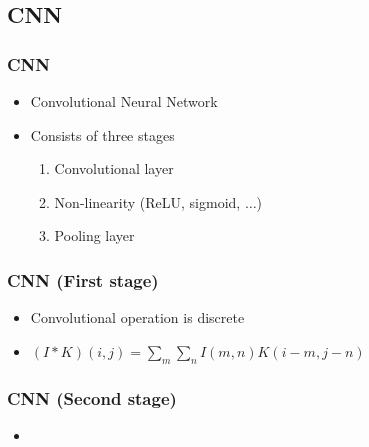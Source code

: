  \subsection{CNN}
  \begin{frame}
   \frametitle{CNN}
   
   \begin{itemize}
    \item<1-> Convolutional Neural Network
    \item<2-> Consists of three stages
    \begin{enumerate}
     \item<3-> Convolutional layer
     \item<4-> Non-linearity (ReLU, sigmoid, $\ldots$)
     \item<5-> Pooling layer
    \end{enumerate}
   \end{itemize}

  \end{frame}
  \begin{frame}
   \frametitle{CNN (First stage)}
   
   \begin{itemize}
    \item<1-> Convolutional operation is discrete
    \item<2-> $(I \ast K)(i,j) = \sum_m\sum_nI(m,n)K(i-m,j-n)$
   \end{itemize}
   
  \end{frame}
  \begin{frame}
   \frametitle{CNN (Second stage)}
   
   \begin{itemize}
    \item<1-> 
   \end{itemize}
   
  \end{frame}
 
